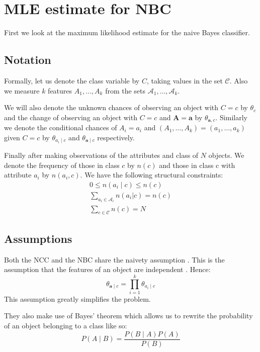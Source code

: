 \chapter{MLE estimate for NBC}

First we look at the maximum likelihood estimate for the naive Bayes classifier.

\section{Notation}

Formally, let us denote the class variable by $C$, taking values in the set $\mathcal{C}$. Also we measure $\mathit{k}$ features $A_1,\dots,A_k$ from the sets $\mathcal{A}_1,\dots,\mathcal{A}_k$.

We will also denote the unknown chances of observing an object with $C=c$ by $\theta_c$ and the change of observing an object with $C=c$ and $\mathbf{A} = \mathbf{a}$ by $\theta_{\mathbf{a}, c}$. Similarly we denote the conditional chances of $A_i=a_i$ and $(A_1,\dots,A_k)=(a_1,\dots,a_k)$ given $C=c$ by $\theta_{a_i \mid c}$ and $\theta_{\mathbf{a} \mid c}$ respectively.

Finally after making observations of the attributes and class of $N$ objects. We denote the frequency of those in class $c$ by $n(c)$ and those in class c with attribute $a_i$ by $n(a_i, c)$. We have the following structural constraints:
\begin{gather}
	0 \leq n(a_i \mid c) \leq n(c) \\
	\sum_{a_i \in \mathcal{A}_i} n(a_i | c) = n(c) \\
	\sum_{c \in \mathcal{C}} n(c) = N
\end{gather}
\section{Assumptions}

Both the NCC and the NBC share the naivety assumption \cite{Zaffalon01}. This is the assumption that the features of an object are independent \cite{Rish01}. Hence:
\begin{equation} \label{naive_assumption}
	\theta_{\mathbf{a} \mid c} = \prod_{i=1}^{k} \theta_{a_i \mid c}
\end{equation}
This assumption greatly simplifies the problem.

They also make use of Bayes' theorem which allows us to rewrite the probability of an object belonging to a class like so:
\begin{equation} \label{bayes_theorem}
    P(A \mid B) = \frac{P(B \mid A) P(A)}{P(B)}
\end{equation}

